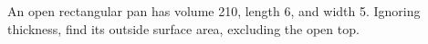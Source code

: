 An open rectangular pan has volume 210, length 6, and width 5. Ignoring thickness, find its outside surface area, excluding the open top.

